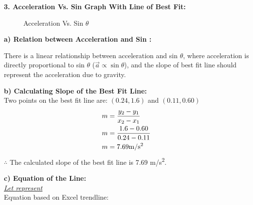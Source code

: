 \documentclass[12pt,letterpaper]{article}
\newcommand\tab[1][1cm]{\hspace*{#1}}
\begin{document}
\noindent
\textbf{3. Acceleration Vs. Sin \bm{$\theta$} Graph With Line of Best Fit:}
\begin{figure}[H]
	\caption{Acceleration Vs. Sin $\theta$\label{figure2}}
	\vspace{-4mm}
\end{figure}
\vspace{-4mm}

\noindent
\textbf{\tab a) Relation between Acceleration and Sin \bm{$\theta$}:}

\noindent
\tab There is a linear relationship between acceleration and sin $\theta$, where acceleration is \tab directly proportional to sin $\theta$ ($\vec{a}\propto \sin\theta$), and the slope of best fit line should \tab represent the acceleration due to gravity.

\newpage

\noindent
\textbf{\tab b) Calculating Slope of the Best Fit Line:}\\
\noindent
\tab Two points on the best fit line are: $(0.24,1.6)$ and $(0.11,0.60)$
\vspace{-4mm}
\[
	\begin{aligned}
		m & = \frac{y_{2}-y_{1}}{x_{2}-x_{1}}   \\
		m & =\frac{1.6-0.60}{0.24-0.11}         \\
		m & =7.69 \text{m/s\textsuperscript{2}}
	\end{aligned}
	\vspace{-4mm}
\]
\noindent
\tab $\therefore$ The calculated slope of the best fit line is 7.69 m/s\textsuperscript{2}.

\vspace{4mm}
\noindent
\textbf{\tab c) Equation of the Line:}\\
\noindent
\tab \underline{\textit{Let  represent \boldmath{$\sin \theta$}}}\\
\tab Equation based on Excel trendline: 
\end{document}
